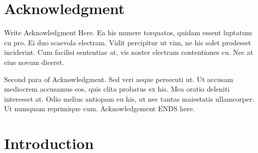 \chapter*{Acknowledgment}
Write Acknowledgment Here. Ea his munere torquatos, quidam essent luptatum cu pro. Ei duo scaevola electram. Vidit percipitur ut vim, ne his solet prodesset inciderint. Cum facilisi sententiae at, vis noster electram contentiones cu. Nec at eius novum diceret.\par
Second para of Acknowledgment. Sed veri aeque persecuti ut. Ut accusam mediocrem accusamus eos, quis clita probatus ex his. Mea oratio deleniti interesset at. Odio melius antiopam eu his, ut nec tantas maiestatis ullamcorper. Ut numquam reprimique cum. Acknowledgement ENDS here.\par
\begin{flushright}
\vskip -20pt
\submittedBy
\end{flushright}

{
\KECadjusttocspacings %
\makeatletter
\def\@makeschapterhead#1{%
  {\newpage \parindent \z@ \raggedright
    \normalfont
    \interlinepenalty\@M
    \center \fontsize{16pt}{1} \bfseries \MakeUppercase{#1}\par\nobreak
    \vskip 18\p@ %
  }}
\makeatother 

\tableofcontents %
\listoffigures %
\listoftables %
}


\newpage
{} %

\chapter{Introduction}
